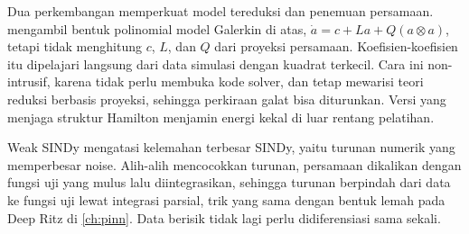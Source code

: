 Dua perkembangan memperkuat model tereduksi dan penemuan persamaan.  \citep{kramer2024}
mengambil bentuk polinomial model Galerkin di atas, $\dot a=c+La+Q(a\otimes a)$, tetapi tidak menghitung $c$, $L$, dan $Q$
dari proyeksi persamaan. Koefisien-koefisien itu dipelajari langsung dari data simulasi dengan kuadrat terkecil. Cara ini
non-intrusif, karena tidak perlu membuka kode solver, dan tetap mewarisi teori reduksi berbasis proyeksi, sehingga
perkiraan galat bisa diturunkan. Versi yang menjaga struktur Hamilton menjamin energi kekal di luar rentang pelatihan.

Weak SINDy \citep{messenger2021} mengatasi kelemahan terbesar SINDy, yaitu turunan numerik yang memperbesar noise. Alih-alih
mencocokkan turunan, persamaan dikalikan dengan fungsi uji yang mulus lalu diintegrasikan, sehingga turunan berpindah dari
data ke fungsi uji lewat integrasi parsial, trik yang sama dengan bentuk lemah pada Deep Ritz di \cref{ch:pinn}. Data
berisik tidak lagi perlu didiferensiasi sama sekali.


